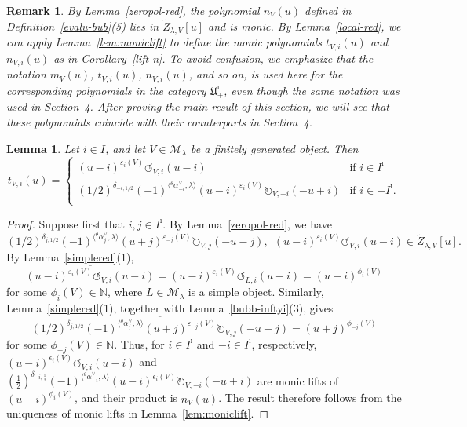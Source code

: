 \documentclass[a4,10pt]{amsart}
\numberwithin{equation}{section}
\newtheorem{Lemma}[Theorem]{Lemma}
\newtheorem{rem}[Theorem]{Remark}
\theoremstyle{definition}
\begin{document}
\begin{rem} By Lemma~\ref{zeropol-red}, the polynomial $n_V(u)$ defined in
Definition~\ref{evalu-bub}(5) lies in $\tilde Z_{\lambda,V}[u]$ and is monic.
By Lemma~\ref{local-red}, we can apply Lemma~\ref{lem:moniclift}  to 
define the monic polynomials $t_{V,i}(u)$ and $n_{V,i}(u)$ as in Corollary~\ref{lift-n}.
To avoid confusion, we emphasize that the notation
$m_V(u)$, $t_{V,i}(u)$, $n_{V,i}(u)$, and so on, is used here for the
corresponding polynomials in the category $\mathfrak U_+^\imath$, even
though the same notation was used in Section~4. After proving the main
result of this section, we will see that these polynomials
coincide with their counterparts in Section~4.
\end{rem}  %
\begin{Lemma}\label{bubb-red}
Let $i\in I$,  and let $V \in \mathcal M_\lambda$ be a  finitely generated object.
Then  
 $$t_{V,i}(u)=\begin{cases} (u-i)^{\varepsilon_i(V)}\circlearrowleft_{V,i}(u-i) & \text{if $i\in I^{\imath}$}\\
(1/2)^{\delta_{-i, 1/2}} (-1)^{\langle {}^\theta\alpha_{-i}^\vee,\lambda\rangle}(u-i)^{\varepsilon_{i}(V)}\circlearrowright_{V,-i}(-u+i) & \text{if $i\in -I^\imath$.}\\
\end{cases} 
$$
 \end{Lemma}


\begin{proof} Suppose first that  $i, j\in I^{\imath}$.
    By Lemma~\ref{zeropol-red}, we have 
   $$(1/2)^{\delta_{j,1/2}}(-1)^{\langle {}^\theta\alpha_j^\vee,\lambda\rangle}(u+j)^{\varepsilon_{-j}(V)}\circlearrowright_{V,j}(-u-j), 
  \ \  (u-i)^{\varepsilon_i(V)}\circlearrowleft_{V,i}(u-i)\in  \tilde{Z}_{\lambda,V}[u].$$
    By Lemma~\ref{simplered}(1),
    $$\overline{(u-i)^{\varepsilon_i(V)}\circlearrowleft_{V,i}(u-i)}  = (u-i)^{\varepsilon_i(V)}\circlearrowleft_{L,i}(u-i) = (u-i)^{\phi_i(V)}$$
    for some $\phi_i(V)\in\mathbb N$, where $L\in\mathcal M_\lambda$ is a simple object.
    Similarly, Lemma~\ref{simplered}(1), together with  Lemma~\ref{bubb-inftyi}(3), gives 
    $$\overline{(1/2)^{\delta_{j,1/2}}(-1)^{\langle {}^\theta\alpha_j^\vee,\lambda\rangle}(u+j)^{\varepsilon_{-j}(V)}\circlearrowright_{V,j}(-u-j)} = (u+j)^{\phi_{-j}(V)}$$
    for some $\phi_{-j}(V)\in\mathbb N$.
   Thus, for \(i\in I^\imath\) and \(-i\in I^\imath\), respectively,
\(
(u-i)^{\epsilon_i(V)}
\circlearrowleft_{V,i}(u-i)
\)
and
\(
\left(\frac{1}{2}\right)^{\delta_{-i,\frac{1}{2}}}
(-1)^{\langle {}^\theta\alpha^\vee_{-i},\lambda\rangle}
(u-i)^{\epsilon_i(V)}
\circlearrowright_{V,-i}(-u+i)
\)
are monic lifts of \((u-i)^{\phi_i(V)}\), and their product is \(n_V(u)\).    
   The result therefore follows from the  uniqueness of monic lifts  in Lemma~\ref{lem:moniclift}.
\end{proof}
\end{document}
